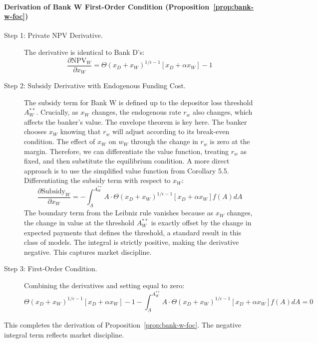 \documentclass[12pt]{article}
\begin{document}
\paragraph{Derivation of Bank W First-Order Condition (Proposition~\ref{prop:bank-w-foc})}
\label{app:deriv-W-FOC}
\begin{description}
    \item[Step 1: Private NPV Derivative.] The derivative is identical to Bank D's:
    \begin{equation*}
    \frac{\partial \text{NPV}_{W}}{\partial x_{W}} = \Theta(x_{D}+x_{W})^{1/\epsilon-1}[x_{D}+\alpha x_{W}] - 1
    \end{equation*}
    \item[Step 2: Subsidy Derivative with Endogenous Funding Cost.] The subsidy term for Bank W is defined up to the depositor loss threshold $A_{W}^{**}$. Crucially, as $x_W$ changes, the endogenous rate $r_w$ also changes, which affects the banker's value. The envelope theorem is key here. The banker chooses $x_W$ knowing that $r_w$ will adjust according to its break-even condition. The effect of $x_W$ on $w_W$ through the change in $r_w$ is zero at the margin. Therefore, we can differentiate the value function, treating $r_w$ as fixed, and then substitute the equilibrium condition. A more direct approach is to use the simplified value function from Corollary 5.5. Differentiating the subsidy term with respect to $x_W$:
    \begin{equation*}
    \frac{\partial \text{Subsidy}_{W}}{\partial x_{W}} = -\int_{\underline{A}}^{A_{W}^{**}}A \cdot \Theta(x_{D}+x_{W})^{1/\epsilon-1}[x_{D}+\alpha x_{W}]f(A)dA
    \end{equation*}
    The boundary term from the Leibniz rule vanishes because as $x_W$ changes, the change in value at the threshold $A_W^{**}$ is exactly offset by the change in expected payments that defines the threshold, a standard result in this class of models. The integral is strictly positive, making the derivative negative. This captures market discipline.
    
    \item[Step 3: First-Order Condition.] Combining the derivatives and setting equal to zero:
    \begin{equation}
    \Theta(x_{D}+x_{W})^{1/\epsilon-1}[x_{D}+\alpha x_{W}]-1 - \int_{\underline{A}}^{A_{W}^{**}}A \cdot \Theta(x_{D}+x_{W})^{1/\epsilon-1}[x_{D}+\alpha x_{W}]f(A)dA = 0
    \end{equation}
\end{description}
This completes the derivation of Proposition~\ref{prop:bank-w-foc}. The negative integral term reflects market discipline.
\end{document}
